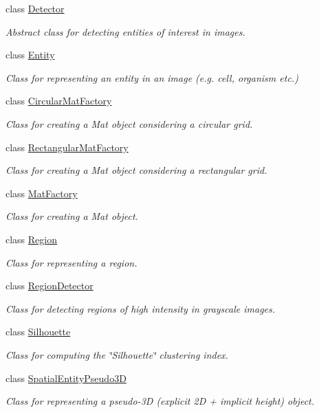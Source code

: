 \begin{DoxyCompactItemize}
class \hyperlink{classmultiscale_1_1analysis_1_1Detector}{\-Detector}
\begin{DoxyCompactList}\small\item\em \-Abstract class for detecting entities of interest in images. \end{DoxyCompactList}\item 
class \hyperlink{classmultiscale_1_1analysis_1_1Entity}{\-Entity}
\begin{DoxyCompactList}\small\item\em \-Class for representing an entity in an image (e.\-g. cell, organism etc.) \end{DoxyCompactList}\item 
class \hyperlink{classmultiscale_1_1analysis_1_1CircularMatFactory}{\-Circular\-Mat\-Factory}
\begin{DoxyCompactList}\small\item\em \-Class for creating a \-Mat object considering a circular grid. \end{DoxyCompactList}\item 
class \hyperlink{classmultiscale_1_1analysis_1_1RectangularMatFactory}{\-Rectangular\-Mat\-Factory}
\begin{DoxyCompactList}\small\item\em \-Class for creating a \-Mat object considering a rectangular grid. \end{DoxyCompactList}\item 
class \hyperlink{classmultiscale_1_1analysis_1_1MatFactory}{\-Mat\-Factory}
\begin{DoxyCompactList}\small\item\em \-Class for creating a \-Mat object. \end{DoxyCompactList}\item 
class \hyperlink{classmultiscale_1_1analysis_1_1Region}{\-Region}
\begin{DoxyCompactList}\small\item\em \-Class for representing a region. \end{DoxyCompactList}\item 
class \hyperlink{classmultiscale_1_1analysis_1_1RegionDetector}{\-Region\-Detector}
\begin{DoxyCompactList}\small\item\em \-Class for detecting regions of high intensity in grayscale images. \end{DoxyCompactList}\item 
class \hyperlink{classmultiscale_1_1analysis_1_1Silhouette}{\-Silhouette}
\begin{DoxyCompactList}\small\item\em \-Class for computing the \char`\"{}\-Silhouette\char`\"{} clustering index. \end{DoxyCompactList}\item 
class \hyperlink{classmultiscale_1_1analysis_1_1SpatialEntityPseudo3D}{\-Spatial\-Entity\-Pseudo3\-D}
\begin{DoxyCompactList}\small\item\em \-Class for representing a pseudo-\/3\-D (explicit 2\-D + implicit height) object. \end{DoxyCompactList}\end{DoxyCompactItemize}
